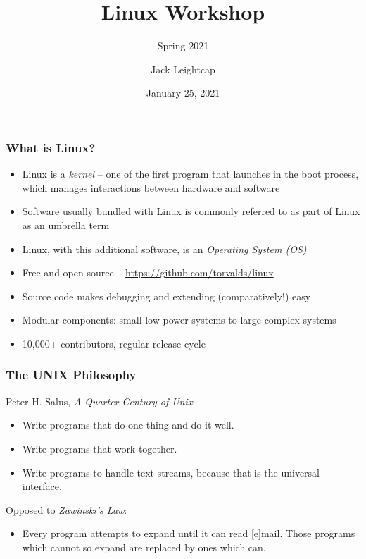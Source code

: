 \documentclass{beamer} \usetheme{Madrid}
\title{Linux Workshop}
\subtitle{Spring 2021}
\author[]{Jack Leightcap\inst{1}\inst{2}}
\institute[IEEE, Wireless Club]{
    \inst{1}IEEE -- \url{nuieeeofficers@gmail.com}
    \and
    \inst{2}Wireless Club -- \url{nuwirelessclub@gmail.com}
}
\date[Fall 2020]{January 25, 2021}
\begin{document}
\frame{\titlepage}

\begin{frame}
    \frametitle{What is Linux?}
    \begin{itemize}
        \item Linux is a \emph{kernel} -- one of the first program that launches in the boot process, which manages interactions between hardware and software
        \item Software usually bundled with Linux is commonly referred to as part of Linux as an umbrella term
        \item Linux, with this additional software, is an \emph{Operating System (OS)}
    \end{itemize}
    \begin{itemize}
        \item Free and open source -- \url{https://github.com/torvalds/linux}
        \item Source code makes debugging and extending (comparatively!) easy
        \item Modular components: small low power systems to large complex systems
        \item 10,000+ contributors, regular release cycle
    \end{itemize}
\end{frame}

\begin{frame}
    \frametitle{The UNIX Philosophy}
    \vfill
    Peter H. Salus, \emph{A Quarter-Century of Unix}:
    \begin{itemize}
        \item Write programs that do one thing and do it well.
        \item Write programs that work together.
        \item Write programs to handle text streams, because that is the universal interface.
    \end{itemize}
    \vspace{1cm}
    Opposed to \emph{Zawinski's Law}:
    \begin{itemize}
        \item Every program attempts to expand until it can read [e]mail.
            Those programs which cannot so expand are replaced by ones which can.
    \end{itemize}
    \vfill
\end{frame}
\end{document}

